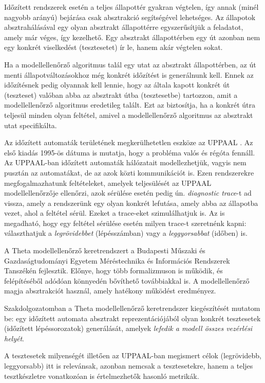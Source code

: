 Időzített rendszerek esetén a teljes állapottér gyakran végtelen, így annak (minél nagyobb arányú) bejárása csak absztrakció segítségével lehetséges. Az állapotok absztrahálásával egy olyan absztrakt állapottérre egyszerűsítjük a feladatot, amely már véges, így kezelhető. Egy absztrakt állapottérben egy út azonban nem egy konkrét viselkedést (tesztesetet) ír le, hanem akár végtelen sokat.

Ha a modellellenőrző algoritmus talál egy utat az absztrakt állapottérben, az út menti állapotváltozásokhoz még konkrét időzítést is generálnunk kell. Ennek az időzítésnek pedig olyannak kell lennie, hogy az általa kapott konkrét út (teszteset) valóban abba az absztrakt útba (tesztesetbe) tartozzon, amit a modellellenőrző algoritmus eredetileg talált. Ezt az biztosítja, ha a konkrét útra teljesül minden olyan feltétel, amivel a modellellenőrző algoritmus az absztrakt utat specifikálta.

Az időzített automaták területének megkerülhetetlen eszköze az UPPAAL \cite{UPPAAL}. Az első kiadás 1995-ös dátuma is mutatja, hogy a probléma valós és régóta fennáll. Az UPPAAL-ban időzített automaták hálózatait modellezhetjük, vagyis nem pusztán az automatákat, de az azok közti kommunikációt is. Ezen rendszerekre megfogalmazhatunk feltételeket, amelyek teljesülését az UPPAAL modellellenőrzője ellenőrzi, azok sérülése esetén pedig ún. \emph{diagnostic trace}-t ad vissza, amely a rendszerünk egy olyan konkrét lefutása, amely abba az állapotba vezet, ahol a feltétel sérül. Ezeket a trace-eket szimulálhatjuk is. Az is megadható, hogy egy feltétel sérülése esetén milyen trace-t szeretnénk kapni: választhatjuk a \emph{legrövidebbet} (lépésszámban) vagy a \emph{leggyorsabbat} (időben) is.

A Theta \cite{Theta} modellellenőrző keretrendszert a Budapesti Műszaki és Gazdaságtudományi Egyetem Méréstechnika és Információs Rendszerek Tanszékén fejlesztik. Előnye, hogy több formalizmuson is működik, és felépítéséből adódóan könnyedén bővíthető továbbiakkal is. A modellellenőrző magja absztrakciót használ, amely hatékony működést eredményez.

Szakdolgozatomban a Theta modellellenőrző keretrendszer kiegészítését mutatom be: egy időzített automata absztrakt reprezentációjából olyan konkrét tesztesetek (időzített lépéssorozatok) generálását, amelyek \emph{lefedik a modell összes vezérlési helyét}.

A tesztesetek milyenségét illetően az UPPAAL-ban megismert célok (legrövidebb, leggyorsabb) itt is relevánsak, azonban nemcsak a tesztesetekre, hanem a teljes tesztkészletre vonatkozóan is értelmezhetők hasonló metrikák.

